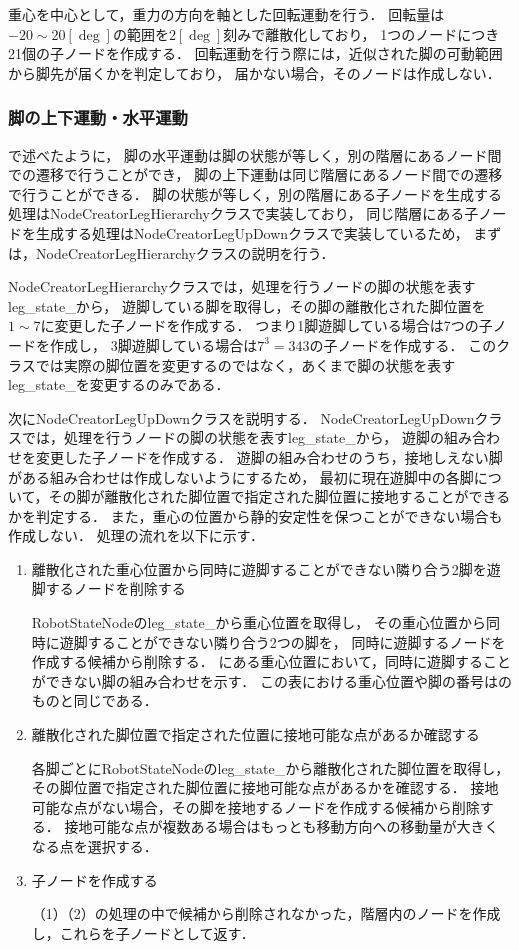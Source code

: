 重心を中心として，重力の方向を軸とした回転運動を行う．
回転量は$-20 \sim 20 [\deg]$の範囲を$2 [\deg]$刻みで離散化しており，
1つのノードにつき21個の子ノードを作成する．
回転運動を行う際には，近似された脚の可動範囲から脚先が届くかを判定しており，
届かない場合，そのノードは作成しない．

\subsubsection{脚の上下運動・水平運動}
で述べたように，
脚の水平運動は脚の状態が等しく，別の階層にあるノード間での遷移で行うことができ，
脚の上下運動は同じ階層にあるノード間での遷移で行うことができる．
脚の状態が等しく，別の階層にある子ノードを生成する処理はNodeCreatorLegHierarchyクラスで実装しており，
同じ階層にある子ノードを生成する処理はNodeCreatorLegUpDownクラスで実装しているため，
まずは，NodeCreatorLegHierarchyクラスの説明を行う．

NodeCreatorLegHierarchyクラスでは，処理を行うノードの脚の状態を表すleg\_state\_から，
遊脚している脚を取得し，その脚の離散化された脚位置を$1 \sim 7$に変更した子ノードを作成する．
つまり1脚遊脚している場合は7つの子ノードを作成し，
3脚遊脚している場合は$7^3 = 343$の子ノードを作成する．
このクラスでは実際の脚位置を変更するのではなく，あくまで脚の状態を表すleg\_state\_を変更するのみである．

次にNodeCreatorLegUpDownクラスを説明する．
NodeCreatorLegUpDownクラスでは，処理を行うノードの脚の状態を表すleg\_state\_から，
遊脚の組み合わせを変更した子ノードを作成する．
遊脚の組み合わせのうち，接地しえない脚がある組み合わせは作成しないようにするため，
最初に現在遊脚中の各脚について，その脚が離散化された脚位置で指定された脚位置に接地することができるかを判定する．
また，重心の位置から静的安定性を保つことができない場合も作成しない．
処理の流れを以下に示す．

\begin{enumerate}
  \item 離散化された重心位置から同時に遊脚することができない隣り合う2脚を遊脚するノードを削除する\par
        RobotStateNodeのleg\_state\_から重心位置を取得し，
        その重心位置から同時に遊脚することができない隣り合う2つの脚を，
        同時に遊脚するノードを作成する候補から削除する．
        にある重心位置において，同時に遊脚することができない脚の組み合わせを示す．
        この表における重心位置や脚の番号はのものと同じである．
  \item 離散化された脚位置で指定された位置に接地可能な点があるか確認する\par
        各脚ごとにRobotStateNodeのleg\_state\_から離散化された脚位置を取得し，
        その脚位置で指定された脚位置に接地可能な点があるかを確認する．
        接地可能な点がない場合，その脚を接地するノードを作成する候補から削除する．
        接地可能な点が複数ある場合はもっとも移動方向への移動量が大きくなる点を選択する．
  \item 子ノードを作成する\par
        （1）（2）の処理の中で候補から削除されなかった，階層内のノードを作成し，これらを子ノードとして返す．
\end{enumerate}

